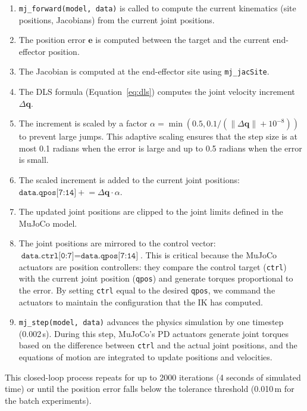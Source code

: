 \documentclass[11pt,a4paper]{report}
\begin{document}
\begin{enumerate}
  \item \texttt{mj\_forward(model, data)} is called to compute the current kinematics (site positions, Jacobians) from the current joint positions.

  \item The position error $\mathbf{e}$ is computed between the target and the current end-effector position.

  \item The Jacobian is computed at the end-effector site using \texttt{mj\_jacSite}.

  \item The DLS formula (Equation~\ref{eq:dls}) computes the joint velocity increment $\Delta\mathbf{q}$.

  \item The increment is scaled by a factor $\alpha = \min(0.5, 0.1 / (\|\Delta\mathbf{q}\| + 10^{-8}))$ to prevent large jumps. This adaptive scaling ensures that the step size is at most 0.1 radians when the error is large and up to 0.5 radians when the error is small.

  \item The scaled increment is added to the current joint positions: $\texttt{data.qpos[7:14]} \mathrel{+}= \Delta\mathbf{q} \cdot \alpha$.

  \item The updated joint positions are clipped to the joint limits defined in the MuJoCo model.

  \item The joint positions are mirrored to the control vector: $\texttt{data.ctrl[0:7]} = \texttt{data.qpos[7:14]}$. This is critical because the MuJoCo actuators are position controllers: they compare the control target (\texttt{ctrl}) with the current joint position (\texttt{qpos}) and generate torques proportional to the error. By setting \texttt{ctrl} equal to the desired \texttt{qpos}, we command the actuators to maintain the configuration that the IK has computed.

  \item \texttt{mj\_step(model, data)} advances the physics simulation by one timestep (0.002\,s). During this step, MuJoCo's PD actuators generate joint torques based on the difference between \texttt{ctrl} and the actual joint positions, and the equations of motion are integrated to update positions and velocities.
\end{enumerate}

This closed-loop process repeats for up to 2000 iterations (4 seconds of simulated time) or until the position error falls below the tolerance threshold (0.010\,m for the batch experiments).
\end{document}

